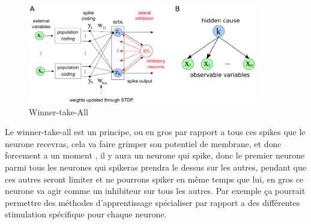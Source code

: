 \begin{figure}[!h]
\centering
\includegraphics[width=10cm]{./images/image10.png}
\caption{Winner-take-All}
\end{figure}

Le winner-take-all est un principe, ou en gros par rapport a tous ces
spikes que le neurone recevras, cela va faire grimper son potentiel de
membrane, et donc forcement a un moment , il y aura un neurone qui
spike, donc le premier neurone parmi tous les neurones qui spikeras
prendra le dessus sur les autres, pendant que ces autres seront limiter
et ne pourrons spiker en même temps que lui, en gros ce neurone va agir
comme un inhibiteur sur tous les autres. Par exemple ça pourrait
permettre des méthodes d'apprentissage spécialiser par rapport a des
différentes stimulation spécifique pour chaque neurone.
